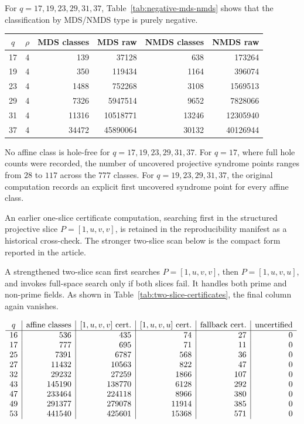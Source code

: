 \documentclass[11pt]{article}
\theoremstyle{plain}
\theoremstyle{definition}
\begin{document}
For \(q=17,19,23,29,31,37\), Table~\ref{tab:negative-mds-nmds} shows that
the classification by MDS/NMDS type is purely negative.
\begin{center}
\label{tab:negative-mds-nmds}
\small
\begin{tabular}{c c r r r r}
\toprule
\(q\)&\(\rho\)&MDS classes&MDS raw&NMDS classes&NMDS raw\\
\midrule
17&4&139   &37128    &638   &173264\\
19&4&350   &119434   &1164  &396074\\
23&4&1488  &752268   &3108  &1569513\\
29&4&7326  &5947514  &9652  &7828066\\
31&4&11316 &10518771 &13246 &12305940\\
37&4&34472 &45890064 &30132 &40126944\\
\bottomrule
\end{tabular}
\end{center}
No affine class is hole-free for \(q=17,19,23,29,31,37\).  For \(q=17\), where full
hole counts were recorded, the number of uncovered projective syndrome points
ranges from \(28\) to \(117\) across the \(777\) classes.  For \(q=19,23,29,31,37\),
the original computation records an explicit first uncovered syndrome point
for every affine class.

An earlier one-slice certificate computation, searching first in the
structured projective slice \(P=[1,u,v,v]\), is retained in the
reproducibility manifest as a historical cross-check.  The stronger
two-slice scan below is the compact form reported in the article.

A strengthened two-slice scan first searches \(P=[1,u,v,v]\), then
\(P=[1,u,v,u]\), and invokes full-space search only if both slices fail.
It handles both prime and non-prime fields.  As shown in
Table~\ref{tab:two-slice-certificates}, the final column again vanishes.
\begin{center}
\label{tab:two-slice-certificates}
\(
\begin{array}{c|r|r|r|r|r}
q & \hbox{affine classes} & [1,u,v,v]\hbox{ cert.}
  & [1,u,v,u]\hbox{ cert.} & \hbox{fallback cert.} & \hbox{uncertified}\\
\hline
16 & 536    & 435    & 74    & 27  & 0\\
17 & 777    & 695    & 71    & 11  & 0\\
25 & 7391   & 6787   & 568   & 36  & 0\\
27 & 11432  & 10563  & 822   & 47  & 0\\
32 & 29232  & 27259  & 1866  & 107 & 0\\
43 & 145190 & 138770 & 6128  & 292 & 0\\
47 & 233464 & 224118 & 8966  & 380 & 0\\
49 & 291377 & 279078 & 11914 & 385 & 0\\
53 & 441540 & 425601 & 15368 & 571 & 0
\end{array}
\)
\end{center}
\end{document}
